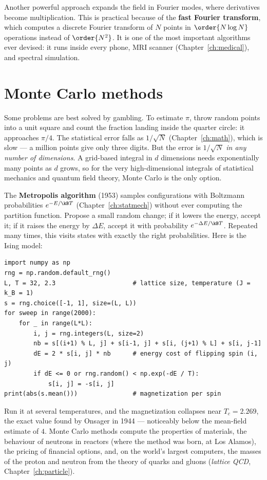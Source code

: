 Another powerful approach expands the field in Fourier modes, where derivatives become multiplication. This is practical because of the \textbf{fast Fourier transform}, which computes a discrete Fourier transform of $N$ points in $\order{N\log N}$ operations instead of $\order{N^2}$. It is one of the most important algorithms ever devised: it runs inside every phone, MRI scanner (Chapter~\ref{ch:medical}), and spectral simulation.

\section{Monte Carlo methods}

Some problems are best solved by gambling. To estimate $\pi$, throw random points into a unit square and count the fraction landing inside the quarter circle: it approaches $\pi/4$. The statistical error falls as $1/\sqrt N$ (Chapter~\ref{ch:math}), which is slow --- a million points give only three digits. But the error is $1/\sqrt N$ \emph{in any number of dimensions}. A grid-based integral in $d$ dimensions needs exponentially many points as $d$ grows, so for the very high-dimensional integrals of statistical mechanics and quantum field theory, Monte Carlo is the only option.

The \textbf{Metropolis algorithm} (1953) samples configurations with Boltzmann probabilities $e^{-E/\kB T}$ (Chapter~\ref{ch:statmech}) without ever computing the partition function. Propose a small random change; if it lowers the energy, accept it; if it raises the energy by $\Delta E$, accept it with probability $e^{-\Delta E/\kB T}$. Repeated many times, this visits states with exactly the right probabilities. Here is the Ising model:

\begin{lstlisting}
import numpy as np
rng = np.random.default_rng()
L, T = 32, 2.3                     # lattice size, temperature (J = k_B = 1)
s = rng.choice([-1, 1], size=(L, L))
for sweep in range(2000):
    for _ in range(L*L):
        i, j = rng.integers(L, size=2)
        nb = s[(i+1) % L, j] + s[i-1, j] + s[i, (j+1) % L] + s[i, j-1]
        dE = 2 * s[i, j] * nb      # energy cost of flipping spin (i, j)
        if dE <= 0 or rng.random() < np.exp(-dE / T):
            s[i, j] = -s[i, j]
print(abs(s.mean()))               # magnetization per spin
\end{lstlisting}

Run it at several temperatures, and the magnetization collapses near $T_c = 2.269$, the exact value found by Onsager in 1944 --- noticeably below the mean-field estimate of $4$. Monte Carlo methods compute the properties of materials, the behaviour of neutrons in reactors (where the method was born, at Los Alamos), the pricing of financial options, and, on the world's largest computers, the masses of the proton and neutron from the theory of quarks and gluons (\emph{lattice QCD}, Chapter~\ref{ch:particle}).

